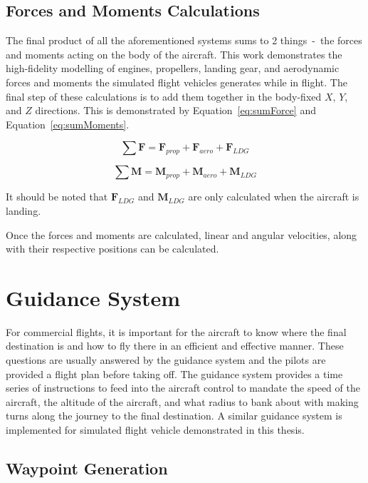 \documentclass[12pt]{report}
\begin{document}
\subsection{Forces and Moments Calculations}
The final product of all the aforementioned systems sums to 2 things~-~the forces and moments acting on the body of the aircraft. This work demonstrates the high-fidelity modelling of engines, propellers, landing gear, and aerodynamic forces and moments the simulated flight vehicles generates while in flight. The final step of these calculations is to add them together in the body-fixed \(X\), \(Y\), and \(Z\) directions. This is demonstrated by Equation~\ref{eq:sumForce} and Equation~\ref{eq:sumMoments}.

\begin{equation}
  \sum \mathbf{F} = \mathbf{F}_{prop} + \mathbf{F}_{aero} + \mathbf{F}_{LDG}
  \label{eq:sumForce}
\end{equation}

\begin{equation}
  \sum \mathbf{M} = \mathbf{M}_{prop} + \mathbf{M}_{aero} + \mathbf{M}_{LDG}
  \label{eq:sumMoments}
\end{equation}

It should be noted that \(\mathbf{F}_{LDG}\) and \(\mathbf{M}_{LDG}\) are only calculated when the aircraft is landing.

Once the forces and moments are calculated, linear and angular velocities, along with their respective positions can be calculated.
\clearpage

\section{Guidance System}
For commercial flights, it is important for the aircraft to know where the final destination is and how to fly there in an efficient and effective manner. These questions are usually answered by the guidance system and the pilots are provided a flight plan before taking off. The guidance system provides a time series of instructions to feed into the aircraft control to mandate the speed of the aircraft, the altitude of the aircraft, and what radius to bank about with making turns along the journey to the final destination. A similar guidance system is implemented for simulated flight vehicle demonstrated in this thesis.

\subsection{Waypoint Generation}
\end{document}
